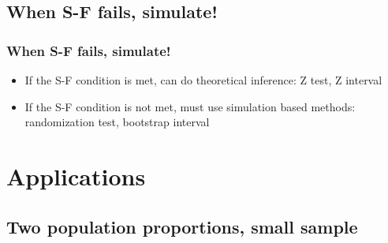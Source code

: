 \documentclass[slidestop,compress,mathserif,12pt,t,professionalfonts,xcolor=table]{beamer}
\begin{document}

\subsection{When S-F fails, simulate!}
\label{mi3}


\begin{frame}
\frametitle{When S-F fails, simulate!}

\begin{itemize}

\item If the S-F condition is met, can do theoretical inference: Z test, Z interval

\item If the S-F condition is not met, must use simulation based methods: randomization test, bootstrap interval

\end{itemize}

\end{frame}


\section{Applications}


\subsection{Two population proportions, small sample}

\end{document}
